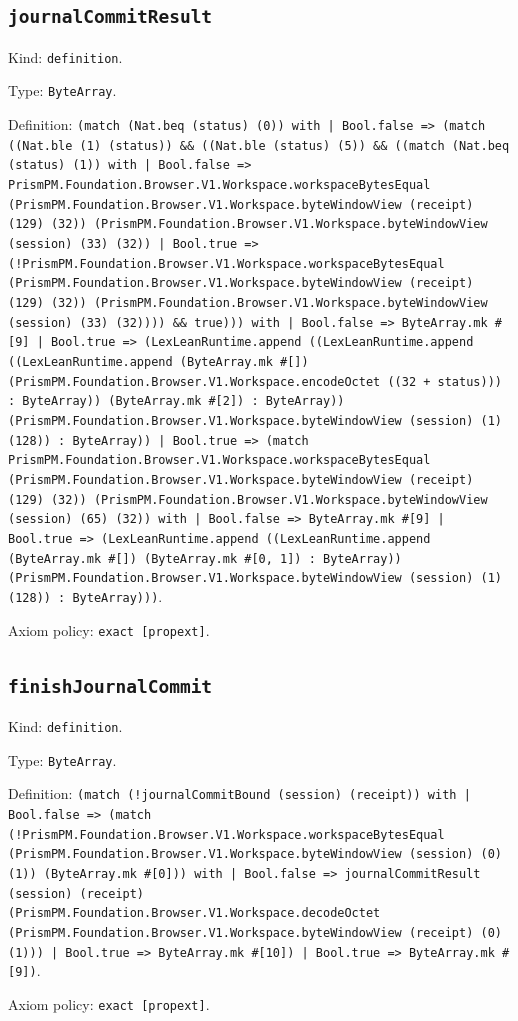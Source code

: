 \documentclass[11pt]{article}
\begin{document}
\subsection*{\texttt{journalCommitResult}}
\noindent Kind: \texttt{definition}.\par
\noindent Type: \texttt{ByteArray}.\par
\noindent Definition: \texttt{(match (Nat.beq (status) (0)) with | Bool.false => (match ((Nat.ble (1) (status)) \&\& ((Nat.ble (status) (5)) \&\& ((match (Nat.beq (status) (1)) with | Bool.false => PrismPM.Foundation.Browser.V1.Workspace.workspaceBytesEqual (PrismPM.Foundation.Browser.V1.Workspace.byteWindowView (receipt) (129) (32)) (PrismPM.Foundation.Browser.V1.Workspace.byteWindowView (session) (33) (32)) | Bool.true => (!PrismPM.Foundation.Browser.V1.Workspace.workspaceBytesEqual (PrismPM.Foundation.Browser.V1.Workspace.byteWindowView (receipt) (129) (32)) (PrismPM.Foundation.Browser.V1.Workspace.byteWindowView (session) (33) (32)))) \&\& true))) with | Bool.false => ByteArray.mk \#[9] | Bool.true => (LexLeanRuntime.append ((LexLeanRuntime.append ((LexLeanRuntime.append (ByteArray.mk \#[]) (PrismPM.Foundation.Browser.V1.Workspace.encodeOctet ((32 + status))) : ByteArray)) (ByteArray.mk \#[2]) : ByteArray)) (PrismPM.Foundation.Browser.V1.Workspace.byteWindowView (session) (1) (128)) : ByteArray)) | Bool.true => (match PrismPM.Foundation.Browser.V1.Workspace.workspaceBytesEqual (PrismPM.Foundation.Browser.V1.Workspace.byteWindowView (receipt) (129) (32)) (PrismPM.Foundation.Browser.V1.Workspace.byteWindowView (session) (65) (32)) with | Bool.false => ByteArray.mk \#[9] | Bool.true => (LexLeanRuntime.append ((LexLeanRuntime.append (ByteArray.mk \#[]) (ByteArray.mk \#[0, 1]) : ByteArray)) (PrismPM.Foundation.Browser.V1.Workspace.byteWindowView (session) (1) (128)) : ByteArray)))}.\par
\noindent Axiom policy: \texttt{exact [propext]}.\par
\subsection*{\texttt{finishJournalCommit}}
\noindent Kind: \texttt{definition}.\par
\noindent Type: \texttt{ByteArray}.\par
\noindent Definition: \texttt{(match (!journalCommitBound (session) (receipt)) with | Bool.false => (match (!PrismPM.Foundation.Browser.V1.Workspace.workspaceBytesEqual (PrismPM.Foundation.Browser.V1.Workspace.byteWindowView (session) (0) (1)) (ByteArray.mk \#[0])) with | Bool.false => journalCommitResult (session) (receipt) (PrismPM.Foundation.Browser.V1.Workspace.decodeOctet (PrismPM.Foundation.Browser.V1.Workspace.byteWindowView (receipt) (0) (1))) | Bool.true => ByteArray.mk \#[10]) | Bool.true => ByteArray.mk \#[9])}.\par
\noindent Axiom policy: \texttt{exact [propext]}.\par
\end{document}

